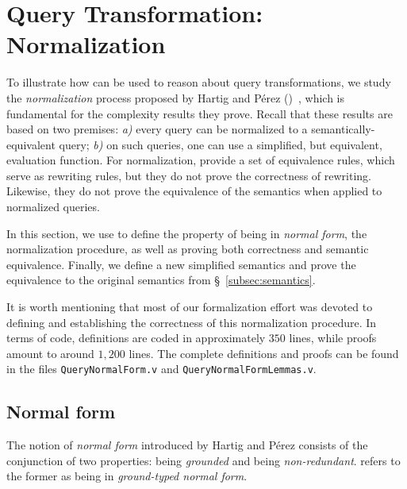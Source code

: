 \section{Query Transformation: Normalization}\label{sec:norm}

To illustrate how \gcoql can be used to reason about query transformations, we study the {\em normalization} process proposed by Hartig and Pérez (\HP)~\cite{gqlph}, which is fundamental for the complexity results they prove.
%
Recall that these results are based on two premises: {\em a)} every query can be normalized to a semantically-equivalent query; {\em b)} on such queries, one can use a simplified, but equivalent, evaluation function. For normalization,  \HP provide a set of equivalence rules, which serve as rewriting rules, but they do not prove the correctness of rewriting. Likewise, they do not prove the equivalence of the semantics when applied to normalized queries.

In this section, we use \gcoql to define the property of being in \textit{normal form}, the normalization procedure, as well as proving both correctness and semantic equivalence. Finally, we define a new simplified semantics and prove the equivalence to the original semantics from \S~\ref{subsec:semantics}.

It is worth mentioning that most of our formalization effort was devoted to defining and establishing the correctness of this normalization procedure. In terms of code, definitions are coded in approximately $350$ lines, while proofs amount to around $1,200$ lines. The complete definitions and proofs can be found in the files \texttt{QueryNormalForm.v} and \texttt{QueryNormalFormLemmas.v}. 

\subsection{Normal form}

The notion of \textit{normal form} introduced by Hartig and Pérez consists of the conjunction of two properties: being \textit{grounded} and being \textit{non-redundant}.
\HP refers to the former as being in \textit{ground-typed normal form}. %

